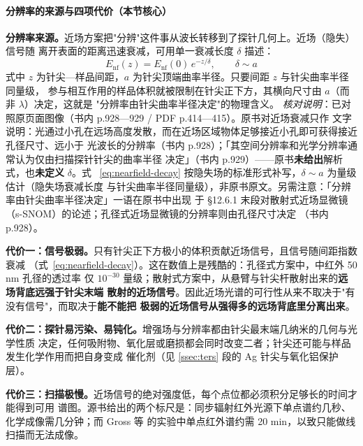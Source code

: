 \paragraph{分辨率的来源与四项代价（本节核心）}
\begin{principle}
\textbf{分辨率来源。}近场方案把"分辨"这件事从波长转移到了探针几何上。近场（隐失）信号随
离开表面的距离迅速衰减，可用单一衰减长度 $\delta$ 描述：
\begin{equation}\label{eq:nearfield-decay}
E_{\mathrm{nf}}(z)=E_{\mathrm{nf}}(0)\,e^{-z/\delta},\qquad \delta \sim a
\end{equation}
式中 $z$ 为针尖—样品间距，$a$ 为针尖顶端曲率半径。只要间距 $z$ 与针尖曲率半径同量级，
参与相互作用的样品体积就被限制在针尖正下方，其横向尺寸由 $a$（而非 $\lambda$）决定，这就是
"分辨率由针尖曲率半径决定"的物理含义。
\emph{核对说明}：已对照原页面图像（书内 p.928—929 / PDF p.414—415）。原书对近场衰减只作
文字说明：光通过小孔在远场高度发散，而在近场区域物体足够接近小孔即可获得接近孔径尺寸、远小于
光波长的分辨率（书内 p.928）；「其空间分辨率和光学分辨率通常认为仅由扫描探针针尖的曲率半径
决定」（书内 p.929）——原书\textbf{未给出}解析式，也\textbf{未定义} $\delta$。式
~\eqref{eq:nearfield-decay} 按隐失场的标准形式补写，$\delta\sim a$ 为量级估计（隐失场衰减长度
与针尖曲率半径同量级），非原书原文。另需注意：「分辨率由针尖曲率半径决定」一语在原书中出现
于 §12.6.1 末段对散射式近场显微镜（s-SNOM）的论述；孔径式近场显微镜的分辨率则由孔径尺寸决定
（书内 p.928）。

\textbf{代价一：信号极弱。}只有针尖正下方极小的体积贡献近场信号，且信号随间距指数衰减
（式~\eqref{eq:nearfield-decay}）。这在数值上是残酷的：孔径式方案中，中红外 50 nm 孔径的透过率
仅 $10^{-30}$ 量级；散射式方案中，从悬臂与针尖杆散射出来的\textbf{远场背底远强于针尖末端
散射的近场信号}。因此近场光谱的可行性从来不取决于"有没有信号"，而取决于\textbf{能不能把
极弱的近场信号从强得多的远场背底里分离出来}。

\textbf{代价二：探针易污染、易钝化。}增强场与分辨率都由针尖最末端几纳米的几何与光学性质
决定，任何吸附物、氧化层或磨损都会同时改变二者；针尖还可能与样品发生化学作用而把自身变成
催化剂（见 \ref{ssec:ters} 段的 Ag 针尖与氧化铝保护层）。

\textbf{代价三：扫描极慢。}近场信号的绝对强度低，每个点位都必须积分足够长的时间才能得到可用
谱图。源书给出的两个标尺是：同步辐射红外光源下单点谱约几秒、化学成像需几分钟；而 Gross 等
的实验中单点红外谱约需 20 min，以致只能做线扫描而无法成像。


\end{principle}
